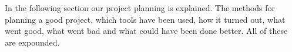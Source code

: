In the following section our project planning is explained. The methods for planning a good project, which tools have been used, how it turned out, what went good, what went bad and what could have been done better. All of these are expounded.